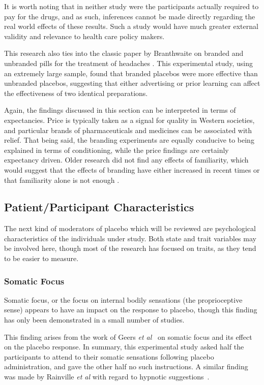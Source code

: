 It is worth noting that in neither study were the participants actually required to pay for the drugs, and as such, inferences cannot be made directly regarding the real world effects of these results. Such a study would have much greater external validity and relevance to health care policy makers. 

This research also ties into the classic paper by Branthwaite on branded and unbranded pills for the treatment of headaches \cite{Branthwaite1981}. This experimental study, using an extremely large sample, found that branded placebos were more effective than unbranded placebos, suggesting that either advertising or prior learning can affect the effectiveness of two identical preparations. 

Again, the findings discussed in this section can be interpreted in terms of  expectancies. Price is typically taken as a signal for quality in Western societies, and particular brands of pharmaceuticals and medicines can be associated with relief. That being said, the branding experiments are equally conducive to being explained in terms of conditioning, while the price findings are certainly expectancy driven. Older research did not find any effects of familiarity, which would suggest that the effects of branding have either increased  in recent times or that familiarity alone is not enough \cite{Morris1974}.  


\subsection{Patient/Participant Characteristics}
\label{sec:psych-char}

The next  kind of moderators of placebo which will be reviewed are psychological characteristics of the individuals under study. Both state and trait variables may be involved here, though most of the research has focused on traits, as they tend to be easier to measure. 

\subsubsection{Somatic Focus}

Somatic focus, or the focus on internal bodily sensations (the proprioceptive sense) appears to have an impact on the response to placebo, though this finding has only been demonstrated in a small number of studies. 

This finding arises from the work of Geers \textit{et al}~\cite{Geers2006}  on somatic focus and its effect on the placebo response. In summary, this experimental study asked half the participants to attend to their somatic sensations following placebo administration, and gave the other half no such instructions. A similar finding was made by Rainville \textit{et al} with regard to hypnotic suggestions~\cite{Price2008}. 

